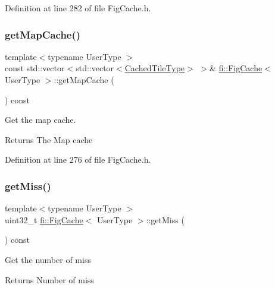 Definition at line 282 of file Fig\+Cache.\+h.

\mbox{\label{classfi_1_1FigCache_a0fd184d36af2622e40cf5d079f23b5b1}} 
\subsubsection{\texorpdfstring{get\+Map\+Cache()}{getMapCache()}}
{\footnotesize\ttfamily template$<$typename User\+Type $>$ \\
const std\+::vector$<$std\+::vector$<$\hyperlink{classfi_1_1FigCache_a7b9bbc4a832c01c3a461f573445c3c41}{Cached\+Tile\+Type}$>$ $>$\& \hyperlink{classfi_1_1FigCache}{fi\+::\+Fig\+Cache}$<$ User\+Type $>$\+::get\+Map\+Cache (\begin{DoxyParamCaption}{ }\end{DoxyParamCaption}) const\hspace{0.3cm}{\ttfamily [inline]}}



Get the map cache. 

\begin{DoxyReturn}{Returns}
The Map cache 
\end{DoxyReturn}


Definition at line 276 of file Fig\+Cache.\+h.

\mbox{\label{classfi_1_1FigCache_a7e66a2834401a655f011e21f90bcdd3a}} 
\subsubsection{\texorpdfstring{get\+Miss()}{getMiss()}}
{\footnotesize\ttfamily template$<$typename User\+Type $>$ \\
uint32\+\_\+t \hyperlink{classfi_1_1FigCache}{fi\+::\+Fig\+Cache}$<$ User\+Type $>$\+::get\+Miss (\begin{DoxyParamCaption}{ }\end{DoxyParamCaption}) const\hspace{0.3cm}{\ttfamily [inline]}}

Get the number of miss \begin{DoxyReturn}{Returns}
Number of miss 
\end{DoxyReturn}


